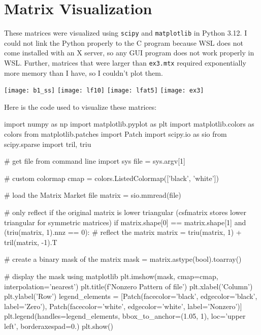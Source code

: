 \documentclass[12pt]{article}
\begin{document}
    \newpage

    \section{Matrix Visualization}
    These matrices were visualized using \verb|scipy| and \verb|matplotlib| in Python 3.12. I could not link the Python properly to the C program because WSL does not come installed with an X server, so any GUI program does not work properly in WSL. Further, matrices that were larger than \verb|ex3.mtx| required exponentially more memory than I have, so I couldn't plot them.

    \begin{center}
        \texttt{[image: b1\_ss]}
        \texttt{[image: lf10]}
        \texttt{[image: lfat5]}
        \texttt{[image: ex3]}
    \end{center}

    \newpage
    Here is the code used to visualize these matrices:

    \begin{python}
import numpy as np
import matplotlib.pyplot as plt
import matplotlib.colors as colors
from matplotlib.patches import Patch
import scipy.io as sio
from scipy.sparse import tril, triu

# get file from command line
import sys
file = sys.argv[1]

# custom colormap
cmap = colors.ListedColormap(['black', 'white'])

# load the Matrix Market file
matrix = sio.mmread(file)

# only reflect if the original matrix is lower triangular (csfmatrix stores lower triangular for symmetric matrices)
if matrix.shape[0] == matrix.shape[1] and (triu(matrix, 1).nnz == 0):
    # reflect the matrix
    matrix = triu(matrix, 1) + tril(matrix, -1).T

# create a binary mask of the matrix
mask = matrix.astype(bool).toarray()

# display the mask using matplotlib
plt.imshow(mask, cmap=cmap, interpolation='nearest')
plt.title(f'Nonzero Pattern of {file}')
plt.xlabel('Column')
plt.ylabel('Row')
legend_elements = [Patch(facecolor='black', edgecolor='black', label='Zero'),
                     Patch(facecolor='white', edgecolor='white', label='Nonzero')]
plt.legend(handles=legend_elements, bbox_to_anchor=(1.05, 1), loc='upper left', borderaxespad=0.)
plt.show()
    \end{python}
\end{document}
